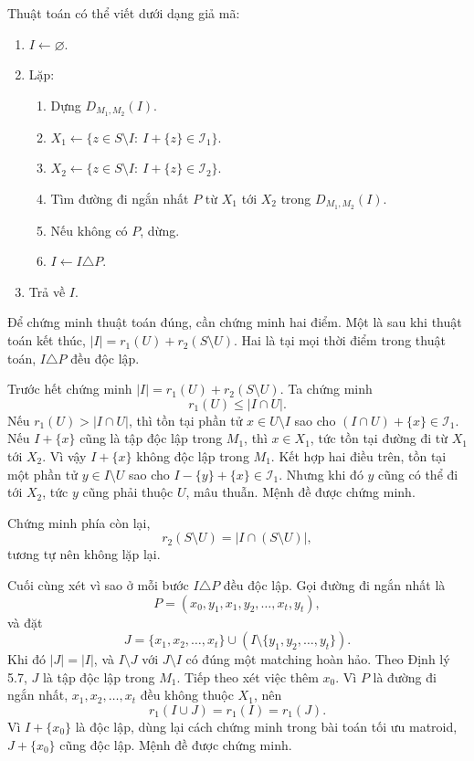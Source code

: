 \documentclass[11pt]{article}
\begin{document}
Thuật toán có thể viết dưới dạng giả mã:
\begin{enumerate}
  \item \(I\leftarrow\varnothing\).
  \item Lặp:
  \begin{enumerate}
    \item Dựng \(D_{M_1,M_2}(I)\).
    \item \(X_1\leftarrow\{z\in S\setminus I:\ I+\{z\}\in\mathcal I_1\}\).
    \item \(X_2\leftarrow\{z\in S\setminus I:\ I+\{z\}\in\mathcal I_2\}\).
    \item Tìm đường đi ngắn nhất \(P\) từ \(X_1\) tới \(X_2\) trong
    \(D_{M_1,M_2}(I)\).
    \item Nếu không có \(P\), dừng.
    \item \(I\leftarrow I\triangle P\).
  \end{enumerate}
  \item Trả về \(I\).
\end{enumerate}

Để chứng minh thuật toán đúng, cần chứng minh hai điểm. Một là sau khi thuật
toán kết thúc, \(|I|=r_1(U)+r_2(S\setminus U)\). Hai là tại mọi thời điểm trong
thuật toán, \(I\triangle P\) đều độc lập.

Trước hết chứng minh \(|I|=r_1(U)+r_2(S\setminus U)\). Ta chứng minh
\[
  r_1(U)\le |I\cap U|.
\]
Nếu \(r_1(U)>|I\cap U|\), thì tồn tại phần tử \(x\in U\setminus I\) sao cho
\((I\cap U)+\{x\}\in\mathcal I_1\). Nếu \(I+\{x\}\) cũng là tập độc lập trong
\(M_1\), thì \(x\in X_1\), tức tồn tại đường đi từ \(X_1\) tới \(X_2\). Vì vậy
\(I+\{x\}\) không độc lập trong \(M_1\). Kết hợp hai điều trên, tồn tại một phần
tử \(y\in I\setminus U\) sao cho \(I-\{y\}+\{x\}\in\mathcal I_1\). Nhưng khi đó
\(y\) cũng có thể đi tới \(X_2\), tức \(y\) cũng phải thuộc \(U\), mâu thuẫn.
Mệnh đề được chứng minh.

Chứng minh phía còn lại,
\[
  r_2(S\setminus U)=|I\cap(S\setminus U)|,
\]
tương tự nên không lặp lại.

Cuối cùng xét vì sao ở mỗi bước \(I\triangle P\) đều độc lập. Gọi đường đi ngắn
nhất là
\[
  P=(x_0,y_1,x_1,y_2,\ldots,x_t,y_t),
\]
và đặt
\[
  J=\{x_1,x_2,\ldots,x_t\}\cup (I\setminus\{y_1,y_2,\ldots,y_t\}).
\]
Khi đó \(|J|=|I|\), và \(I\setminus J\) với \(J\setminus I\) có đúng một
matching hoàn hảo. Theo Định lý 5.7, \(J\) là tập độc lập trong \(M_1\). Tiếp
theo xét việc thêm \(x_0\). Vì \(P\) là đường đi ngắn nhất,
\(x_1,x_2,\ldots,x_t\) đều không thuộc \(X_1\), nên
\[
  r_1(I\cup J)=r_1(I)=r_1(J).
\]
Vì \(I+\{x_0\}\) là độc lập, dùng lại cách chứng minh trong bài toán tối ưu
matroid, \(J+\{x_0\}\) cũng độc lập. Mệnh đề được chứng minh.
\end{document}
